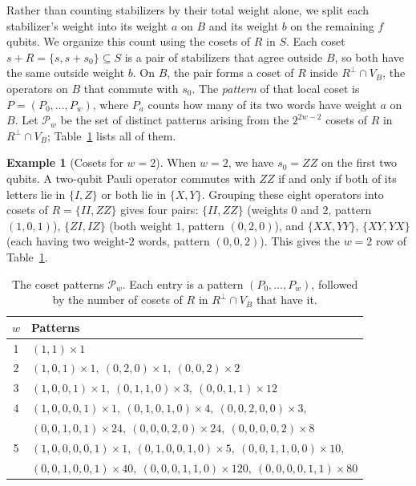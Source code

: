 \documentclass[11pt]{article}
\theoremstyle{definition}
\newtheorem{example}[theorem]{Example}
\theoremstyle{remark}
\begin{document}
Rather than counting stabilizers by their total weight alone, we split
each stabilizer's weight into its weight \(a\) on \(B\) and its weight
\(b\) on the remaining \(f\) qubits. We organize this count using the
cosets of \(R\) in \(S\). Each coset \(s+R=\{s,s+s_0\}\subseteq S\) is a
pair of stabilizers that agree outside \(B\), so both have the same
outside weight \(b\). On \(B\), the pair forms a coset of \(R\) inside
\(R^\perp\cap V_B\), the operators on \(B\) that commute with \(s_0\).
The \emph{pattern} of that local coset is \(P=(P_0,\ldots,P_w)\), where
\(P_a\) counts how many of its two words have weight \(a\) on \(B\).
Let \(\mathcal P_w\) be the set of distinct patterns arising from the
\(2^{2w-2}\) cosets of \(R\) in \(R^\perp\cap V_B\);
Table~\ref{tab:patterns} lists all of them.

\begin{example}[Cosets for \(w=2\)]
When \(w=2\), we have \(s_0=ZZ\) on the first two qubits. A two-qubit
Pauli operator commutes with \(ZZ\) if and only if both of its letters
lie in \(\{I,Z\}\) or both lie in \(\{X,Y\}\). Grouping these eight
operators into cosets of \(R=\{II,ZZ\}\) gives four pairs:
\(\{II,ZZ\}\) (weights \(0\) and \(2\), pattern \((1,0,1)\)),
\(\{ZI,IZ\}\) (both weight \(1\), pattern \((0,2,0)\)), and
\(\{XX,YY\}\), \(\{XY,YX\}\) (each having two weight-\(2\) words,
pattern \((0,0,2)\)). This gives the \(w=2\) row of
Table~\ref{tab:patterns}.
\end{example}

\begin{table}[htbp]
\centering\small
\caption{The coset patterns \(\mathcal P_w\). Each entry is a pattern
\((P_0,\ldots,P_w)\), followed by the number of cosets of \(R\) in
\(R^\perp\cap V_B\) that have it.}\label{tab:patterns}
\begin{tabular}{@{}cl@{}}\toprule
\(w\)&Patterns\\\midrule
1&\((1,1)\times1\)\\
2&\((1,0,1)\times1,\ (0,2,0)\times1,\ (0,0,2)\times2\)\\
3&\((1,0,0,1)\times1,\ (0,1,1,0)\times3,\ (0,0,1,1)\times12\)\\
4&\((1,0,0,0,1)\times1,\ (0,1,0,1,0)\times4,\ (0,0,2,0,0)\times3,\)\\
 &\((0,0,1,0,1)\times24,\ (0,0,0,2,0)\times24,\ (0,0,0,0,2)\times8\)\\
5&\((1,0,0,0,0,1)\times1,\ (0,1,0,0,1,0)\times5,\ (0,0,1,1,0,0)\times10,\)\\
 &\((0,0,1,0,0,1)\times40,\ (0,0,0,1,1,0)\times120,\ (0,0,0,0,1,1)\times80\)\\\bottomrule
\end{tabular}
\end{table}
\end{document}
